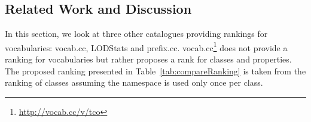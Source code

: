\subsection{Related Work and Discussion}
\label{sec:related}
In this section, we look at three other catalogues providing rankings for vocabularies: vocab.cc, LODStats and prefix.cc. vocab.cc\footnote{\url{http://vocab.cc/v/tco}} does not provide a ranking for vocabularies but rather proposes a rank for classes and properties. The proposed ranking presented in Table~\ref{tab:compareRanking} is taken from the ranking of classes assuming the namespace is used only once per class.

\begin{table}[!htbp]
\end{table}

